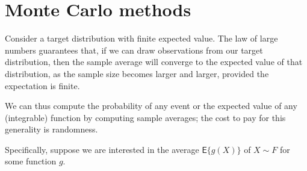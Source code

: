 \documentclass[
  11pt,
  letterpaper,
]{scrbook}
\theoremstyle{definition}
\theoremstyle{definition}
\theoremstyle{definition}
\theoremstyle{plain}
\theoremstyle{plain}
\theoremstyle{remark}
\begin{document}
\section{Monte Carlo methods}\label{monte-carlo-methods}

Consider a target distribution with finite expected value. The law of
large numbers guarantees that, if we can draw observations from our
target distribution, then the sample average will converge to the
expected value of that distribution, as the sample size becomes larger
and larger, provided the expectation is finite.

We can thus compute the probability of any event or the expected value
of any (integrable) function by computing sample averages; the cost to
pay for this generality is randomness.

Specifically, suppose we are interested in the average
\(\mathsf{E}\{g(X)\}\) of \(X \sim F\) for some function \(g\).
\end{document}
